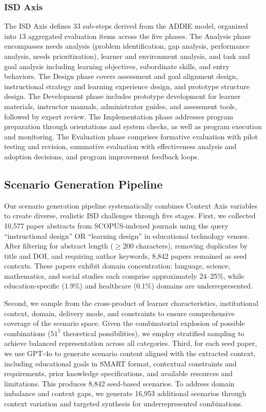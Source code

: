 \subsubsection{ISD Axis}
The ISD Axis defines 33 sub-steps derived from the ADDIE model, organized into 13 aggregated evaluation items across the five phases. The Analysis phase encompasses needs analysis (problem identification, gap analysis, performance analysis, needs prioritization), learner and environment analysis, and task and goal analysis including learning objectives, subordinate skills, and entry behaviors. The Design phase covers assessment and goal alignment design, instructional strategy and learning experience design, and prototype structure design. The Development phase includes prototype development for learner materials, instructor manuals, administrator guides, and assessment tools, followed by expert review. The Implementation phase addresses program preparation through orientations and system checks, as well as program execution and monitoring. The Evaluation phase comprises formative evaluation with pilot testing and revision, summative evaluation with effectiveness analysis and adoption decisions, and program improvement feedback loops.

\subsection{Scenario Generation Pipeline}
\label{subsec:scenario-generation}

Our scenario generation pipeline systematically combines Context Axis variables to create diverse, realistic ISD challenges through five stages. First, we collected 10,577 paper abstracts from SCOPUS-indexed journals using the query ``instructional design'' OR ``learning design'' in educational technology venues. After filtering for abstract length ($\geq$200 characters), removing duplicates by title and DOI, and requiring author keywords, 8,842 papers remained as seed contexts. These papers exhibit domain concentration: language, science, mathematics, and social studies each comprise approximately 24--25\%, while education-specific (1.9\%) and healthcare (0.1\%) domains are underrepresented.

Second, we sample from the cross-product of learner characteristics, institutional context, domain, delivery mode, and constraints to ensure comprehensive coverage of the scenario space. Given the combinatorial explosion of possible combinations ($51^5$ theoretical possibilities), we employ stratified sampling to achieve balanced representation across all categories. Third, for each seed paper, we use GPT-4o to generate scenario content aligned with the extracted context, including educational goals in SMART format, contextual constraints and requirements, prior knowledge specifications, and available resources and limitations. This produces 8,842 seed-based scenarios. To address domain imbalance and context gaps, we generate 16,953 additional scenarios through context variation and targeted synthesis for underrepresented combinations.

